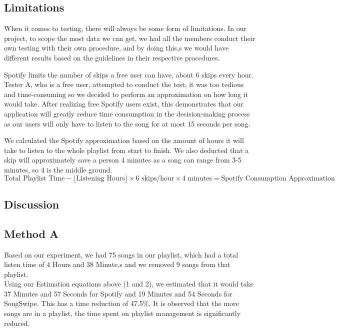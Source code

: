 \documentclass{article}
\begin{document}
\subsection{Limitations}
When it comes to testing, there will always be some form of limitations. In our project, to scope the most data we can get, we had all the members conduct their own testing with their own procedure, and by doing this,s we would have different results based on the guidelines in their respective procedures.

Spotify limits the number of skips a free user can have, about 6 skips every hour. Tester A, who is a free user, attempted to conduct the test; it was too tedious and time-consuming so we decided to perform an approximation on how long it would take. After realizing free Spotify users exist, this demonstrates that our application will greatly reduce time consumption in the decision-making process as our users will only have to listen to the song for at most 15 seconds per song.
    
\begin{center}
    We calculated the Spotify approximation based on the amount of hours it will take to listen to the whole playlist from start to finish. We also deducted that a skip will approximately save a person 4 minutes as a song can range from 3-5 minutes, so 4 is the middle ground. \newline 
\begin{equation}
\text{Total Playlist Time} - \lfloor\text{Listening Hours}\rfloor \times 6\text{ skips/hour} \times 4\text{ minutes} = \text{Spotify Consumption Approximation}
\end{equation}
\end{center}

\subsection{Discussion}

\subsection*{Method A}
Based on our experiment, we had 75 songs in our playlist, which had a total listen time of 4 Hours and 38 Minute,s and we removed 9 songs from that playlist. \\
    
Using our Estimation equations above (1 and 2), we estimated that it would take 37 Minutes and 57 Seconds for Spotify and 19 Minutes and 54 Seconds for SongSwipe. This has a time reduction of 47.5\%. It is observed that the more songs are in a playlist, the time spent on playlist management is significantly reduced.\\
    
\end{document}
